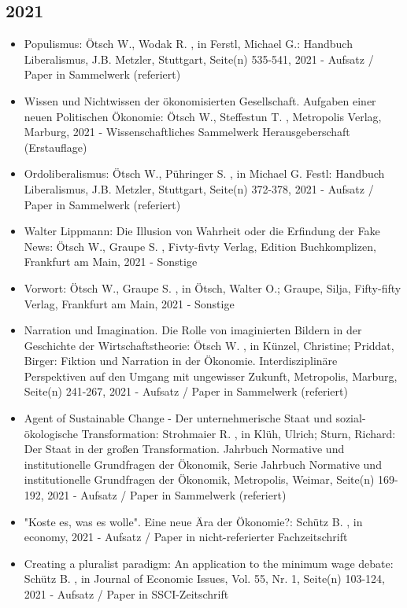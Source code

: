 \subsection{2021} 
 \begin{itemize} 
	 \item Populismus: Ötsch W., Wodak R. , in Ferstl, Michael G.: Handbuch Liberalismus, J.B. Metzler, Stuttgart, Seite(n) 535-541, 2021 - Aufsatz / Paper in Sammelwerk (referiert)
	 \item Wissen und Nichtwissen der ökonomisierten Gesellschaft. Aufgaben einer neuen Politischen Ökonomie: Ötsch W., Steffestun T. , Metropolis Verlag, Marburg, 2021 - Wissenschaftliches Sammelwerk Herausgeberschaft (Erstauflage)
	 \item Ordoliberalismus: Ötsch W., Pühringer S. , in Michael G. Festl: Handbuch Liberalismus, J.B. Metzler, Stuttgart, Seite(n) 372-378, 2021 - Aufsatz / Paper in Sammelwerk (referiert)
	 \item Walter Lippmann: Die Illusion von Wahrheit oder die Erfindung der Fake News: Ötsch W., Graupe S. , Fivty-fivty Verlag, Edition Buchkomplizen, Frankfurt am Main, 2021 - Sonstige
	 \item Vorwort: Ötsch W., Graupe S. , in Ötsch, Walter O.; Graupe, Silja, Fifty-fifty Verlag, Frankfurt am Main, 2021 - Sonstige
	 \item Narration und Imagination. Die Rolle von imaginierten Bildern in der Geschichte der Wirtschaftstheorie: Ötsch W. , in Künzel, Christine; Priddat, Birger: Fiktion und Narration in der Ökonomie. Interdisziplinäre Perspektiven auf den Umgang mit ungewisser Zukunft, Metropolis, Marburg, Seite(n) 241-267, 2021 - Aufsatz / Paper in Sammelwerk (referiert)
	 \item Agent of Sustainable Change - Der unternehmerische Staat und sozial-ökologische Transformation: Strohmaier R. , in Klüh, Ulrich; Sturn, Richard: Der Staat in der großen Transformation. Jahrbuch Normative und institutionelle Grundfragen der Ökonomik, Serie Jahrbuch Normative und institutionelle Grundfragen der Ökonomik, Metropolis, Weimar, Seite(n) 169-192, 2021 - Aufsatz / Paper in Sammelwerk (referiert)
	 \item "Koste es, was es wolle". Eine neue Ära der Ökonomie?: Schütz B. , in economy, 2021 - Aufsatz / Paper in nicht-referierter Fachzeitschrift
	 \item Creating a pluralist paradigm: An application to the minimum wage debate: Schütz B. , in Journal of Economic Issues, Vol. 55, Nr. 1, Seite(n) 103-124, 2021 - Aufsatz / Paper in SSCI-Zeitschrift

\end{itemize}
